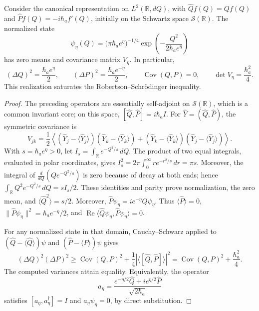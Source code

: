 \begin{proposition}
\label{md:antmem:covarianza-gaussiana}
Consider the canonical representation on \(L^2(\mathbb R,dQ)\), with
\(\widehat Qf(Q)=Qf(Q)\) and
\(\widehat Pf(Q)=-i\hbar_a f'(Q)\), initially on the Schwartz
space \(\mathcal S(\mathbb R)\). The normalized state
\begin{equation}
 \psi_\eta(Q)=\bigl(\pi\hbar_a e^\eta\bigr)^{-1/4}
 \exp\!\left(-\frac{Q^2}{2\hbar_a e^\eta}\right)
 \label{md:antmem:gaussiana-accion}
\end{equation}
has zero means and covariance matrix \(V_\eta\). In particular,
\begin{equation}
 (\Delta Q)^2=\frac{\hbar_a e^\eta}{2},\qquad
 (\Delta P)^2=\frac{\hbar_a e^{-\eta}}{2},\qquad
 \operatorname{Cov}(Q,P)=0,\qquad
 \det V_\eta=\frac{\hbar_a^2}{4}.
 \label{md:antmem:varianzas-accion}
\end{equation}
This realization saturates the Robertson--Schrödinger inequality.
\end{proposition}

\begin{proof}
The preceding operators are essentially self-adjoint on
\(\mathcal S(\mathbb R)\), which is a common invariant core;
on this space,
\([\widehat Q,\widehat P]=i\hbar_a I\). For
\(\widehat Y=(\widehat Q,\widehat P)\), the symmetric covariance is
\[
 V_{jk}=\frac12\left\langle
 (\widehat Y_j-\langle\widehat Y_j\rangle)
 (\widehat Y_k-\langle\widehat Y_k\rangle)
 +(\widehat Y_k-\langle\widehat Y_k\rangle)
 (\widehat Y_j-\langle\widehat Y_j\rangle)
 \right\rangle.
\]
With \(s=\hbar_a e^\eta>0\), let
\(I_s=\int_{\mathbb R}e^{-Q^2/s}\,dQ\). The product of two
equal integrals, evaluated in polar coordinates, gives
\(I_s^2=2\pi\int_0^\infty r e^{-r^2/s}\,dr=\pi s\).
Moreover, the integral of
\(\frac{d}{dQ}(Qe^{-Q^2/s})\) is zero because of decay at both
ends; hence
\(\int_{\mathbb R}Q^2e^{-Q^2/s}\,dQ=sI_s/2\).
These identities and parity prove normalization, the zero mean, and
\(\langle\widehat Q^2\rangle=s/2\). Moreover,
\(\widehat P\psi_\eta=i e^{-\eta}Q\psi_\eta\).
Thus \(\langle\widehat P\rangle=0\),
\(\|\widehat P\psi_\eta\|^2=\hbar_a e^{-\eta}/2\), and
\(\operatorname{Re}\langle\widehat Q\psi_\eta,
\widehat P\psi_\eta\rangle=0\).

For any normalized state in that domain, Cauchy--Schwarz applied
to \((\widehat Q-\langle\widehat Q\rangle)\psi\) and
\((\widehat P-\langle\widehat P\rangle)\psi\) gives
\[
 (\Delta Q)^2(\Delta P)^2
 \geq \operatorname{Cov}(Q,P)^2
       +\frac14\left|\langle[\widehat Q,\widehat P]\rangle\right|^2
 =\operatorname{Cov}(Q,P)^2+\frac{\hbar_a^2}{4}.
\]
The computed variances attain equality. Equivalently, the
operator
\[
 a_\eta=\frac{e^{-\eta/2}\widehat Q
                  +i e^{\eta/2}\widehat P}{\sqrt{2\hbar_a}}
\]
satisfies \([a_\eta,a_\eta^\dagger]=I\) and
\(a_\eta\psi_\eta=0\), by direct substitution.
\end{proof}

